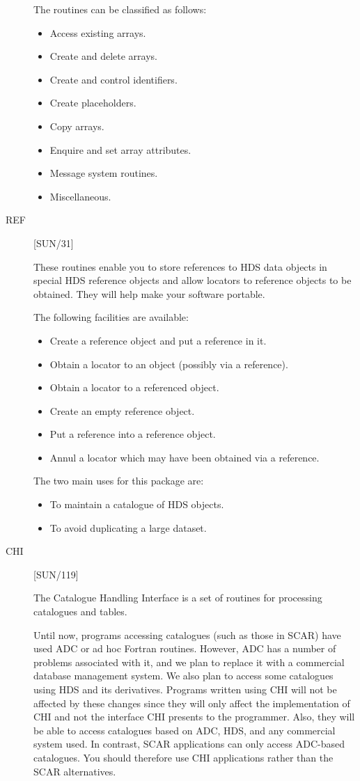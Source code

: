 \begin{description}
The routines can be classified as follows:
\begin{itemize}
\item Access existing arrays.
\item Create and delete arrays.
\item Create and control identifiers.
\item Create placeholders.
\item Copy arrays.
\item Enquire and set array attributes.
\item Message system routines.
\item Miscellaneous.
\end{itemize}

\item [REF] \hfill [SUN/31]

These routines enable you to store references to HDS data objects in special HDS
reference objects and allow locators to reference objects to be obtained.
They will help make your software portable.

The following facilities are available:
\begin{itemize}
\item Create a reference object and put a reference in it.
\item Obtain a locator to an object (possibly via a reference).
\item Obtain a locator to a referenced object.
\item Create an empty reference object.
\item Put a reference into a reference object.
\item Annul a locator which may have been obtained via a reference.
\end{itemize}

The two main uses for this package are:
\begin{itemize}
\item To maintain a catalogue of HDS objects.
\item To avoid duplicating a large dataset.
\end{itemize}

\item [CHI] \hfill [SUN/119]

The Catalogue Handling Interface is a set of routines for processing catalogues
and tables.

Until now, programs accessing catalogues (such as those in SCAR) have used ADC
or ad hoc Fortran routines.
However, ADC has a number of problems associated with it, and we plan to
replace it with a commercial database management system.
We also plan to access some catalogues using HDS and its derivatives.
Programs written using CHI will not be affected by these changes since they
will only affect the implementation of CHI and not the interface CHI presents
to the programmer.
Also, they will be able to access catalogues based on ADC, HDS, and any
commercial system used.
In contrast, SCAR applications can only access ADC-based catalogues. 
You should therefore use CHI applications rather than the SCAR alternatives.


\end{description}
